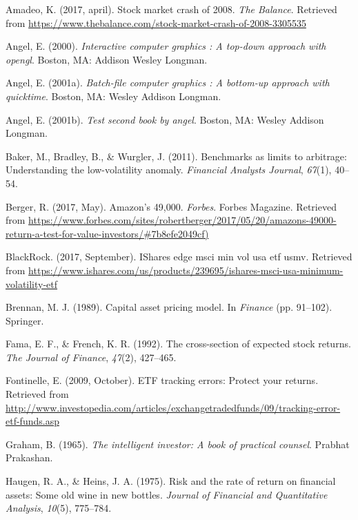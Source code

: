 \documentclass[12pt,twoside]{reedthesis}
\theoremstyle{definition}
\theoremstyle{definition}
\theoremstyle{definition}
\theoremstyle{remark}
\begin{document}
\hypertarget{refs}{}
\hypertarget{ref-amadeo2017}{}
Amadeo, K. (2017, april). Stock market crash of 2008. \emph{The
Balance}. Retrieved from
\url{https://www.thebalance.com/stock-market-crash-of-2008-3305535}

\hypertarget{ref-angel2000}{}
Angel, E. (2000). \emph{Interactive computer graphics : A top-down
approach with opengl}. Boston, MA: Addison Wesley Longman.

\hypertarget{ref-angel2001}{}
Angel, E. (2001a). \emph{Batch-file computer graphics : A bottom-up
approach with quicktime}. Boston, MA: Wesley Addison Longman.

\hypertarget{ref-angel2002a}{}
Angel, E. (2001b). \emph{Test second book by angel}. Boston, MA: Wesley
Addison Longman.

\hypertarget{ref-baker2011}{}
Baker, M., Bradley, B., \& Wurgler, J. (2011). Benchmarks as limits to
arbitrage: Understanding the low-volatility anomaly. \emph{Financial
Analysts Journal}, \emph{67}(1), 40--54.

\hypertarget{ref-berger2017}{}
Berger, R. (2017, May). Amazon's 49,000. \emph{Forbes}. Forbes Magazine.
Retrieved from
\url{https://www.forbes.com/sites/robertberger/2017/05/20/amazons-49000-return-a-test-for-value-investors/\#7b8efe2049cf)}

\hypertarget{ref-blackrock2017}{}
BlackRock. (2017, September). IShares edge msci min vol usa etf
\textbar{} usmv. Retrieved from
\url{https://www.ishares.com/us/products/239695/ishares-msci-usa-minimum-volatility-etf}

\hypertarget{ref-brennan1989}{}
Brennan, M. J. (1989). Capital asset pricing model. In \emph{Finance}
(pp. 91--102). Springer.

\hypertarget{ref-fama1992}{}
Fama, E. F., \& French, K. R. (1992). The cross-section of expected
stock returns. \emph{The Journal of Finance}, \emph{47}(2), 427--465.

\hypertarget{ref-fontinelle2009}{}
Fontinelle, E. (2009, October). ETF tracking errors: Protect your
returns. Retrieved from
\url{http://www.investopedia.com/articles/exchangetradedfunds/09/tracking-error-etf-funds.asp}

\hypertarget{ref-graham1965}{}
Graham, B. (1965). \emph{The intelligent investor: A book of practical
counsel}. Prabhat Prakashan.

\hypertarget{ref-haugen1975}{}
Haugen, R. A., \& Heins, J. A. (1975). Risk and the rate of return on
financial assets: Some old wine in new bottles. \emph{Journal of
Financial and Quantitative Analysis}, \emph{10}(5), 775--784.
\end{document}
